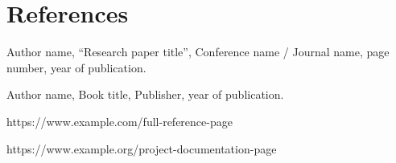 \documentclass[12pt,a4paper]{report}
\begin{document}
\chapter*{References}
\begin{enumerate}[label={[\arabic*]},leftmargin=0.35in,itemsep=6pt]
\item Author name, ``Research paper title'', Conference name / Journal name, page number, year of publication.
\item Author name, Book title, Publisher, year of publication.
\item https://www.example.com/full-reference-page
\item https://www.example.org/project-documentation-page
\end{enumerate}
\end{document}
